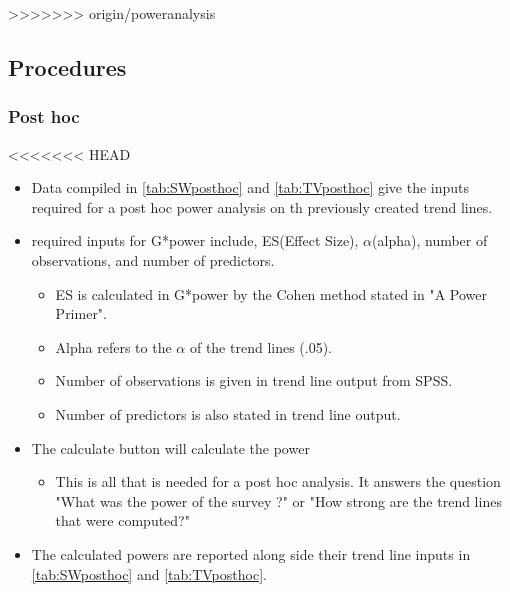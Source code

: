 >>>>>>> origin/poweranalysis
\subsection{Procedures}

\subsubsection{Post hoc}
<<<<<<< HEAD
\begin{itemize}
	\item Data compiled in \autoref{tab:SWposthoc} and \autoref{tab:TVposthoc} give the inputs required for a post hoc power analysis on th previously created trend lines.
	\item required inputs for G*power include, ES(Effect Size), $\alpha$(alpha), number of observations, and number of predictors.
	\begin{itemize}
		\item ES is calculated in G*power by the Cohen method stated in \citep{cohen1992power} "A Power Primer".
		\item Alpha refers to the $\alpha$ of the trend lines (.05).
		\item Number of observations is given in trend line output from SPSS.
		\item Number of predictors is also stated in trend line output.
	\end{itemize}
	\item The calculate button will calculate the power
	\begin{itemize}
		\item This is all that is needed for a post hoc analysis.  It answers the question "What was the power of the survey ?" or "How strong are the trend lines that were computed?"
	\end{itemize}
	\item The calculated powers are reported along side their trend line inputs in \autoref{tab:SWposthoc} and \autoref{tab:TVposthoc}.
\end{itemize}
